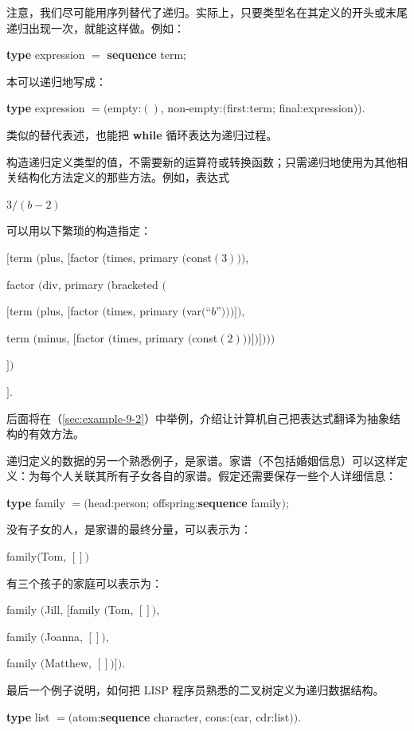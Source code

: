 注意，我们尽可能用序列替代了递归。实际上，只要类型名在其定义的开头或末尾递归出现一次，就能这样做。例如：

\quad \textbf{type} expression $=$ \textbf{sequence} term;

\noindent
本可以递归地写成：

\quad \textbf{type} expression $= ($empty:$()$, non-empty:$($first:term; final:expression$))$.

\noindent
类似的替代表述，也能把 \textbf{while} 循环表达为递归过程。

构造递归定义类型的值，不需要新的运算符或转换函数；只需递归地使用为其他相关结构化方法定义的那些方法。例如，表达式

\quad $3/(b - 2)$

\noindent
可以用以下繁琐的构造指定：

\quad $[$term $($plus, $[$factor (times, primary $($const$(3)))$,

\tabto*{7.75em} factor $($div, primary $($bracketed $($

\tabto*{9em}  $[$term $($plus, $[$factor $($times, primary $($var$($``$b$''$)))]),$

\tabto*{9.1em}  term $($minus, $[$factor $($times, primary $($const$(2)))])])))$

\tabto*{7.55em}  $])$

\quad $]$.

\noindent
后面将在（\ref{sec:example-9-2}）中举例，介绍让计算机自己把表达式翻译为抽象结构的有效方法。

递归定义的数据的另一个熟悉例子，是家谱。家谱（不包括婚姻信息）可以这样定义：为每个人关联其所有子女各自的家谱。假定还需要保存一些个人详细信息：

\quad \textbf{type} family $= ($head:person; offspring:\textbf{sequence} family$)$;

没有子女的人，是家谱的最终分量，可以表示为：

\quad family$($Tom, $[])$

\noindent
有三个孩子的家庭可以表示为：

\noindent
family $($Jill, $[$family $($Tom, $[])$,

\tabto{3.2em} family $($Joanna, $[])$,

\tabto{3.2em} family $($Matthew, $[])])$.

最后一个例子说明，如何把 LISP 程序员熟悉的二叉树定义为递归数据结构。

\quad \textbf{type} list $= ($atom:\textbf{sequence} character, cons:$($car, cdr:list$))$.


